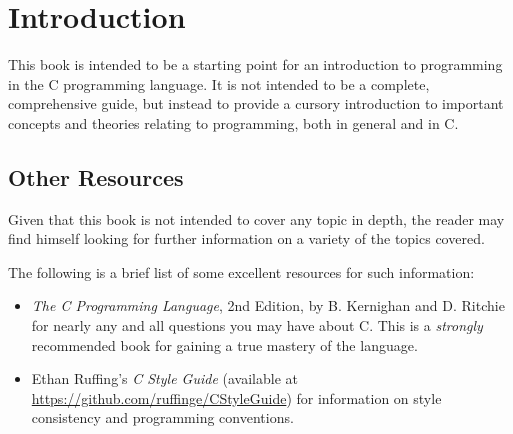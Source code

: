 \documentclass[IntroToC.tex]{subfiles}
\begin{document}
\chapter*{Introduction}\label{ch:introduction}
This book is intended to be a starting point for an introduction to programming
in the C programming language. It is not intended to be a complete,
comprehensive guide, but instead to provide a cursory introduction to important
concepts and theories relating to programming, both in general and in C.

\section*{Other Resources}\label{sec:other-resources}
Given that this book is not intended to cover any topic in depth, the reader may
find himself looking for further information on a variety of the topics covered.

The following is a brief list of some excellent resources for such information:

\begin{itemize}
	\item \emph{The C Programming Language}, 2nd Edition, by B. Kernighan and 
		D. Ritchie for nearly any and all questions you may have about C. This
		is a \emph{strongly} recommended book for gaining a true mastery of the
		language.
	\item Ethan Ruffing's \emph{C Style Guide} (available at
		\url{https://github.com/ruffinge/CStyleGuide}) for information on style
		consistency and programming conventions.
\end{itemize}
\end{document}
